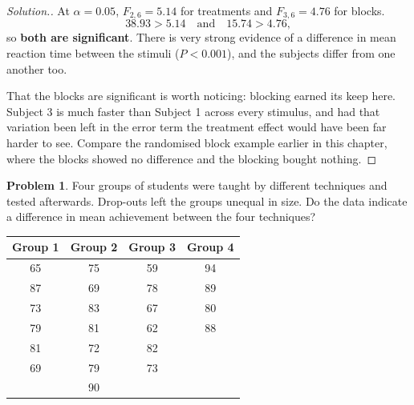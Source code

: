 \documentclass[11pt,a4paper]{article}
\theoremstyle{definition}
\newtheorem{problemx}{Problem}[section]
\newenvironment{problem}{\begin{problemx}}{\end{problemx}}
\newenvironment{solution}
  {\renewcommand{\qedsymbol}{}\begin{proof}[\textit{Solution}.]}
  {\end{proof}}
\begin{document}
\begin{solution}
At $\alpha=0.05$, $F_{2,6}=5.14$ for treatments and $F_{3,6}=4.76$ for blocks.
\[38.93>5.14\quad\text{and}\quad 15.74>4.76,\]
so \textbf{both are significant}. There is very strong evidence of a difference in mean
reaction time between the stimuli ($P<0.001$), and the subjects differ from one another too.

That the blocks are significant is worth noticing: blocking earned its keep here. Subject 3
is much faster than Subject 1 across every stimulus, and had that variation been left in the
error term the treatment effect would have been far harder to see. Compare the randomised
block example earlier in this chapter, where the blocks showed no difference and the
blocking bought nothing.
\end{solution}

\begin{problem}
Four groups of students were taught by different techniques and tested afterwards. Drop-outs
left the groups unequal in size. Do the data indicate a difference in mean achievement
between the four techniques?
\begin{table}[H]
\centering
\begin{tabular}{|c|c|c|c|}
\hline
Group 1 & Group 2 & Group 3 & Group 4\\
\hline
65 & 75 & 59 & 94\\
87 & 69 & 78 & 89\\
73 & 83 & 67 & 80\\
79 & 81 & 62 & 88\\
81 & 72 & 82 & \\
69 & 79 & 73 & \\
   & 90 &    & \\
\hline
\end{tabular}
\end{table}
\end{problem}
\end{document}
